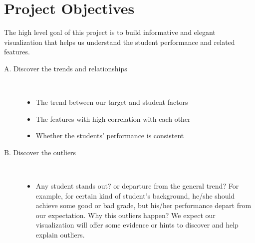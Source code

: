 \documentclass{article}
\begin{document}
\section{Project Objectives}
The high level goal of this project is to build informative and elegant visualization that helps us understand the student performance and related features.
\begin{description}
\item [A. Discover the trends and relationships]  \
\begin{itemize}
\item The trend between our target and student factors
\item The features with high correlation with each other
\item Whether the students' performance is consistent
\end{itemize}

\item [B. Discover the outliers]  \
\begin{itemize}
\item Any student stands out? or departure from the general trend? For example, for certain kind of student's background, he/she should achieve some good or bad grade, but his/her performance depart from our expectation. Why this outliers happen? We expect our visualization will offer some evidence or hints to discover and help explain outliers.
\end{itemize}
\end{description}
\end{document}
